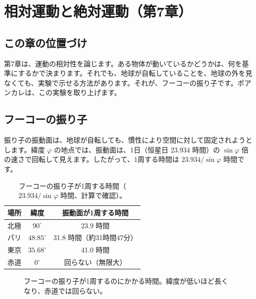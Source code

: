 \documentclass[a4paper,11pt,openany]{ltjsbook}
\begin{document}
\chapter{相対運動と絶対運動（第7章）}

\section{この章の位置づけ}

第7章は、運動の相対性を論じます。ある物体が動いているかどうかは、何を基準にするかで決まります。それでも、地球が自転していることを、地球の外を見なくても、実験で示せる方法があります。それが、フーコーの振り子です。ポアンカレは、この実験を取り上げます。

\section{フーコーの振り子}

振り子の振動面は、地球が自転しても、慣性により空間に対して固定されようとします。緯度 $\varphi$ の地点では、振動面は、1日（恒星日 $23.934$ 時間）の $\sin\varphi$ 倍の速さで回転して見えます。したがって、1周する時間は $23.934/\sin\varphi$ 時間です。

\begin{table}[htbp]
\centering
\begin{tabular}{lcc}
\toprule
場所 & 緯度 & 振動面が1周する時間\\
\midrule
北極 & $90^\circ$ & 23.9 時間\\
パリ & $48.85^\circ$ & 31.8 時間（約31時間47分）\\
東京 & $35.68^\circ$ & 41.0 時間\\
赤道 & $0^\circ$ & 回らない（無限大）\\
\bottomrule
\end{tabular}
\caption{フーコーの振り子が1周する時間（$23.934/\sin\varphi$ 時間、計算で確認）。}
\end{table}

\begin{figure}[htbp]
\centering
{}
\caption{フーコーの振り子が1周するのにかかる時間。緯度が低いほど長くなり、赤道では回らない。}
\end{figure}
\end{document}
